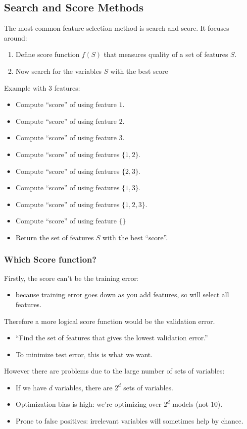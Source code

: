 \documentclass{article}
\def\blu#1{{\color{blu}#1}}
\def\gre#1{{\color{gre}#1}}
\def\red#1{{\color{red}#1}}
\theoremstyle{definition}
\begin{document}
\subsection*{Search and Score Methods}
The most common feature selection method is \blu{search and score}. It focuses around:
\begin{enumerate}
	\item Define \blu{score function $ f(S) $} that measures quality of a set of features $ S $.
	\item Now \blu{search} for the variables $ S $ with the best score
\end{enumerate}
Example with 3 features:
\begin{itemize} [label = -]
	
	\item Compute “score” of using feature $ 1 $. 
	\item Compute “score” of using feature $ 2 $. 
	\item Compute “score” of using feature $ 3 $. 
	\item Compute “score” of using features $ \{1,2\} $. 
	\item Compute “score” of using features $ \{2,3\} $.
	\item Compute “score” of using features $ \{1,3\} $.
	\item Compute “score” of using features $ \{1,2, 3\} $.
	\item Compute “score” of using feature $ \{ \} $
	\item Return the set of features $ S $ with the best “score”.
\end{itemize}

\subsubsection*{Which Score function?}
Firstly, the \red{score can’t be the training error}:
\begin{itemize}[label = -]
	\item because training error goes down as you add features, so will \red{select all features}.
\end{itemize}
Therefore a more logical score function would be the \blu{validation error}. 
\begin{itemize}[label = -]
	\item “\gre{Find the set of features that gives the lowest validation error.}” 
	\item To minimize test error, this is what we want.
\end{itemize}
However there are problems due to the large \red{number of sets of variables}:
\begin{itemize}[label = -]
	\item If we have $ d $ variables, there are \red{$ 2^d $ sets} of variables.
	\item \red{Optimization bias} is high: we’re optimizing over $ 2^d $ models (not 10).
	\item Prone to \red{false positives}: irrelevant variables will sometimes help by chance.
\end{itemize}
\end{document}
